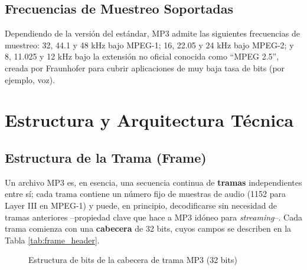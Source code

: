 \documentclass[pdflatex,sn-mathphys-num]{sn-jnl}%
\begin{document}
\subsection{Frecuencias de Muestreo Soportadas}
Dependiendo de la versión del estándar, MP3 admite las siguientes frecuencias de muestreo: 32, 44.1 y 48 kHz bajo MPEG-1; 16, 22.05 y 24 kHz bajo MPEG-2; y 8, 11.025 y 12 kHz bajo la extensión no oficial conocida como ``MPEG 2.5'', creada por Fraunhofer para cubrir aplicaciones de muy baja tasa de bits (por ejemplo, voz).

\section{Estructura y Arquitectura Técnica}\label{sec:architecture}

\subsection{Estructura de la Trama (Frame)}\label{sec:frame}
Un archivo MP3 es, en esencia, una secuencia continua de \textbf{tramas} independientes entre sí; cada trama contiene un número fijo de muestras de audio (1152 para Layer III en MPEG-1) y puede, en principio, decodificarse sin necesidad de tramas anteriores --propiedad clave que hace a MP3 idóneo para \textit{streaming}--. Cada trama comienza con una \textbf{cabecera} de 32 bits, cuyos campos se describen en la Tabla \ref{tab:frame_header}.

\begin{figure}[!h]
    \centering
    \caption{Estructura de bits de la cabecera de trama MP3 (32 bits)}
    \label{fig:frame_header}
\end{figure}
\end{document}
